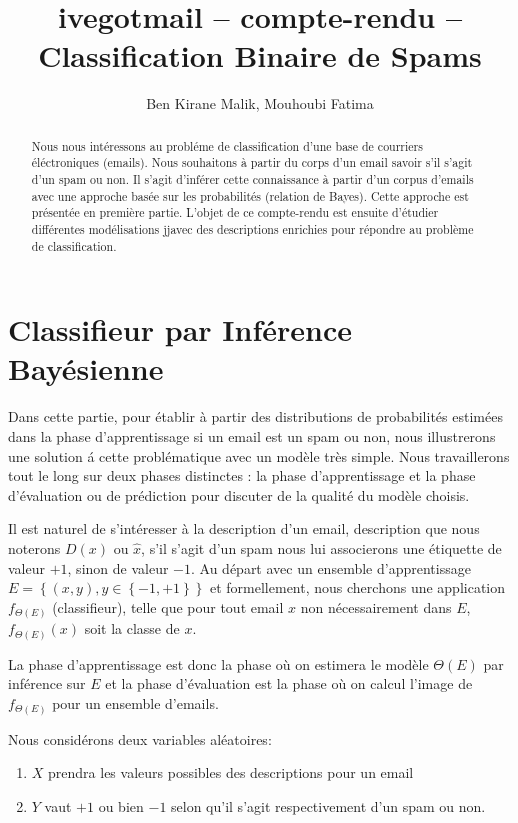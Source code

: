 \documentclass[a4paper, french]{article}
\title{ivegotmail -- compte-rendu --\\ Classification Binaire de Spams}
\author{Ben Kirane Malik, Mouhoubi Fatima}
\begin{document}
\maketitle
\setlength{\parskip}{0.1in}
\setlength{\parindent}{15pt}

\begin{abstract}
Nous nous int\'eressons au probl\'eme de classification d'une base de courriers
\'el\'ectroniques (emails).
Nous souhaitons \`a partir du corps d'un email savoir s'il s'agit
d'un spam ou non. Il s'agit d'inf\'erer cette connaissance \`a partir
d'un corpus d'emails avec une approche bas\'ee sur les probabilit\'es
(relation de Bayes). Cette approche est  pr\'esent\'ee en premi\`ere partie.
L'objet de ce compte-rendu est ensuite d'\'etudier diff\'erentes mod\'elisations
jjavec des descriptions enrichies pour r\'epondre au probl\`eme de classification.
\end{abstract}

\section{Classifieur par Inf\'erence Bay\'esienne}
Dans cette partie, pour \'etablir  \`a partir des distributions de
probabilit\'es estim\'ees dans la phase d'apprentissage si un email est
un spam ou non, nous illustrerons une solution \'a cette probl\'ematique
avec un mod\`ele tr\`es simple.
Nous travaillerons tout le long sur deux phases distinctes :
la phase d'apprentissage et la phase d'\'evaluation ou de pr\'ediction pour
discuter de la qualit\'e du mod\`ele choisis.

Il est naturel de s'int\'eresser \`a la description d'un email, description que
nous noterons $D(x)$ ou $\hat{x}$, s'il s'agit d'un spam nous lui associerons
une \'etiquette de valeur $+1$, sinon de valeur $-1$.
Au d\'epart avec un ensemble d'apprentissage
$E=\left\{(x,y), y\in \left\{-1,+1\right\}\right\}$ et formellement,
nous cherchons une application $f_{\Theta(E)}$  (classifieur),
telle que pour tout email $x$ non n\'ecessairement dans $E$, $f_{\Theta(E)}(x)$
soit la classe de $x$.

La phase d'apprentissage est donc la phase o\`u on estimera le mod\`ele
$\Theta(E)$ par inf\'erence sur $E$ et la phase d'\'evaluation est la phase
o\`u on calcul l'image de $f_{\Theta(E)}$ pour un ensemble d'emails.

Nous consid\'erons deux variables al\'eatoires:
\begin{enumerate}
\item $X$ prendra les valeurs possibles des descriptions pour un email
\item $Y$ vaut $+1$ ou bien $-1$ selon qu'il s'agit respectivement
d'un spam ou non.
\end{enumerate}
\end{document}

